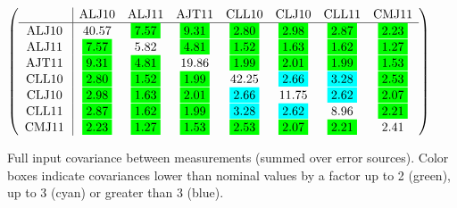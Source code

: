 \begin{table}[H]
\scriptsize
\begin{center}
\renewcommand{\arraystretch}{1.1}
\begin{math}\left(\begin{array}{c|ccccccc}
 & \mathrm{ALJ10} & 
\mathrm{ALJ11} & 
\mathrm{AJT11} & 
\mathrm{CLL10} & 
\mathrm{CLJ10} & 
\mathrm{CLL11} & 
\mathrm{CMJ11} \\
\hline
\mathrm{ALJ10} \hspace*{2pt} &      40.57 &  \colorbox{Green1}{$      7.57$} &  \colorbox{Green1}{$      9.31$} &  \colorbox{Green1}{$      2.80$} &  \colorbox{Green1}{$      2.98$} &  \colorbox{Green1}{$      2.87$} &  \colorbox{Green1}{$      2.23$} \\
\mathrm{ALJ11} \hspace*{2pt} &  \colorbox{Green1}{$      7.57$} &       5.82 &  \colorbox{Green1}{$      4.81$} &  \colorbox{Green1}{$      1.52$} &  \colorbox{Green1}{$      1.63$} &  \colorbox{Green1}{$      1.62$} &  \colorbox{Green1}{$      1.27$} \\
\mathrm{AJT11} \hspace*{2pt} &  \colorbox{Green1}{$      9.31$} &  \colorbox{Green1}{$      4.81$} &      19.86 &  \colorbox{Green1}{$      1.99$} &  \colorbox{Green1}{$      2.01$} &  \colorbox{Green1}{$      1.99$} &  \colorbox{Green1}{$      1.53$} \\
\mathrm{CLL10} \hspace*{2pt} &  \colorbox{Green1}{$      2.80$} &  \colorbox{Green1}{$      1.52$} &  \colorbox{Green1}{$      1.99$} &      42.25 &  \colorbox{Cyan1}{$      2.66$} &  \colorbox{Cyan1}{$      3.28$} &  \colorbox{Green1}{$      2.53$} \\
\mathrm{CLJ10} \hspace*{2pt} &  \colorbox{Green1}{$      2.98$} &  \colorbox{Green1}{$      1.63$} &  \colorbox{Green1}{$      2.01$} &  \colorbox{Cyan1}{$      2.66$} &      11.75 &  \colorbox{Cyan1}{$      2.62$} &  \colorbox{Green1}{$      2.07$} \\
\mathrm{CLL11} \hspace*{2pt} &  \colorbox{Green1}{$      2.87$} &  \colorbox{Green1}{$      1.62$} &  \colorbox{Green1}{$      1.99$} &  \colorbox{Cyan1}{$      3.28$} &  \colorbox{Cyan1}{$      2.62$} &       8.96 &  \colorbox{Green1}{$      2.21$} \\
\mathrm{CMJ11} \hspace*{2pt} &  \colorbox{Green1}{$      2.23$} &  \colorbox{Green1}{$      1.27$} &  \colorbox{Green1}{$      1.53$} &  \colorbox{Green1}{$      2.53$} &  \colorbox{Green1}{$      2.07$} &  \colorbox{Green1}{$      2.21$} &       2.41 \\
\end{array}\right)\end{math}
\caption{Full input covariance between measurements (summed over error sources). Color boxes indicate covariances lower than nominal values by a factor up to 2 (green), up to 3 (cyan) or greater than 3 (blue).}
\renewcommand{\arraystretch}{1}
\end{center}
\end{table}
